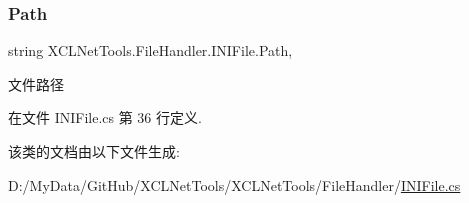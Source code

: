 \subsubsection{\texorpdfstring{Path}{Path}}
{\footnotesize\ttfamily string X\+C\+L\+Net\+Tools.\+File\+Handler.\+I\+N\+I\+File.\+Path\hspace{0.3cm}{\ttfamily [get]}, {\ttfamily [set]}}



文件路径 



在文件 I\+N\+I\+File.\+cs 第 36 行定义.



该类的文档由以下文件生成\+:\begin{DoxyCompactItemize}
\item 
D\+:/\+My\+Data/\+Git\+Hub/\+X\+C\+L\+Net\+Tools/\+X\+C\+L\+Net\+Tools/\+File\+Handler/\hyperlink{_i_n_i_file_8cs}{I\+N\+I\+File.\+cs}\end{DoxyCompactItemize}
